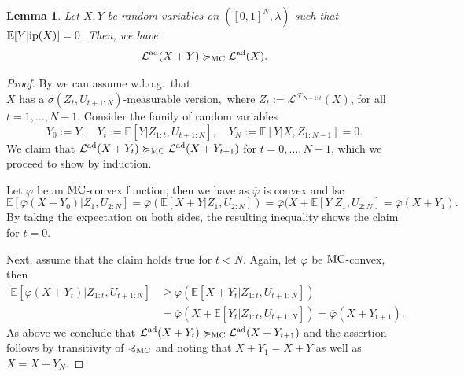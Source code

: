 \documentclass[a4paper]{amsart}
\numberwithin{theorem}{section}
\newtheorem{lemma}[theorem]{Lemma}
\theoremstyle{definition}
\newcommand{\E}{\mathbb{E}}
\newcommand{\law}{\mathcal{L}}
\renewcommand{\phi}{\varphi}
\newcommand{\mc}{\textup{MC}}
\newcommand{\MC}{\textup{MC}}
\newcommand{\lemc}{\preccurlyeq_\mc}
\newcommand{\gemc}{\succcurlyeq_\mc}
\newcommand{\ip}{\textup{ip}}
\newcommand{\lawad}{\law^{\textup{ad}}}
\begin{document}
\begin{lemma}\label{lem:MCmonotone} 
    Let $X,Y$ be random variables on $([0,1]^N,\lambda)$ such that $\mathbb E[ Y |  \ip(X) ] = 0$.
    Then, we have $$\lawad(X + Y) \gemc \lawad(X).$$
\end{lemma}


\begin{proof}
    By  we can assume w.l.o.g.\ that \(
        X \text{ has a }\sigma(Z_t, U_{t+1:N})\text{-measurable version},\)
    where $Z_t := \law^{\mathcal F_{N-1:t}}(X)$, for all $t = 1,\dots,N-1$.
    Consider the family of random variables
    \[
        Y_0 := Y, \quad Y_t := \E[ Y | Z_{1:t}, U_{t+1:N}], \quad Y_N := \E[ Y | X, Z_{1:N-1} ] = 0.
    \]
    We claim that $\lawad(X + Y_t) \gemc \lawad(X + Y_{t + 1})$ for $t = 0, \dots, N-1$, which we proceed to show by induction.

    Let $\phi$ be an $\MC$-convex function, then we have as $\overline{\phi}$ is convex and lsc
    \[
        \E[\overline{\phi}(X + Y_0) | Z_1, U_{2:N}] = \overline{\phi}(\E[ X + Y | Z_1, U_{2:N}] ) = \overline{\phi}(X + \E[Y | Z_1,U_{2:N}] = \overline{\phi}(X + Y_1).
    \]
    By taking the expectation on both sides, the resulting inequality shows the claim for $t = 0$.

    Next, assume that the claim holds true for $t < N$. Again, let $\phi$ be $\MC$-convex, then
    \begin{align*}
        \E[\overline{\phi}(X + Y_t) | Z_{1:t}, U_{t + 1: N}] &\ge
        \overline{\phi}(\E[X + Y_t | Z_{1:t}, U_{t + 1 : N}]) 
        \\
        &= \overline{\phi}(X + \E[Y_t | Z_{1:t}, U_{t + 1 : N}]) =
        \overline{\phi}(X + Y_{t + 1}).
    \end{align*}
    As above we conclude that $\lawad(X + Y_t) \gemc \lawad(X + Y_{t+1})$ and the assertion follows by transitivity of $\lemc$ and noting that $X + Y_1 = X + Y$ as well as $X = X + Y_N$.
\end{proof}
\end{document}
